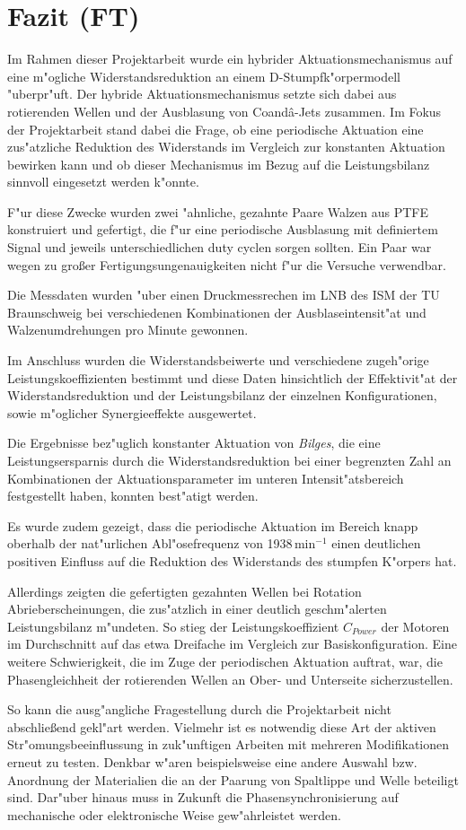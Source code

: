 \chapter{Fazit (FT)}\label{s:fazit}
Im Rahmen dieser Projektarbeit wurde ein hybrider Aktuationsmechanismus auf eine m"ogliche Widerstandsreduktion an einem D-Stumpfk"orpermodell "uberpr"uft.
Der hybride Aktuationsmechanismus setzte sich dabei aus rotierenden Wellen und der Ausblasung von Coand\^{a}-Jets zusammen.
Im Fokus der Projektarbeit stand dabei die Frage, ob eine periodische Aktuation eine zus"atzliche Reduktion des Widerstands im Vergleich zur konstanten Aktuation bewirken kann und ob dieser Mechanismus im Bezug auf die Leistungsbilanz sinnvoll eingesetzt werden k"onnte.

F"ur diese Zwecke wurden zwei "ahnliche, gezahnte Paare Walzen aus PTFE konstruiert und gefertigt, die f"ur eine periodische Ausblasung mit definiertem Signal und jeweils unterschiedlichen duty cyclen sorgen sollten. Ein Paar war wegen zu gro\ss{}er Fertigungsungenauigkeiten nicht f"ur die Versuche verwendbar.

Die Messdaten wurden "uber einen Druckmessrechen im LNB des ISM der TU Braunschweig bei verschiedenen Kombinationen der Ausblaseintensit"at und Walzenumdrehungen pro Minute gewonnen.

Im Anschluss wurden die Widerstandsbeiwerte  und verschiedene zugeh"orige Leistungskoeffizienten bestimmt und diese Daten hinsichtlich der Effektivit"at der Widerstandsreduktion und der Leistungsbilanz der einzelnen Konfigurationen, sowie m"oglicher Synergieeffekte ausgewertet.

Die Ergebnisse bez"uglich konstanter Aktuation von \textit{Bilges}, die eine Leistungsersparnis durch die Widerstandsreduktion bei einer begrenzten Zahl an Kombinationen der Aktuationsparameter im unteren Intensit"atsbereich festgestellt haben, konnten best"atigt werden. 

Es wurde zudem gezeigt, dass die periodische Aktuation im Bereich knapp oberhalb der nat"urlichen Abl"osefrequenz von 1938\,$\mathrm{min^{-1}}$ einen deutlichen positiven Einfluss auf die Reduktion des Widerstands des stumpfen K"orpers hat.

Allerdings zeigten die gefertigten gezahnten Wellen bei Rotation Abrieberscheinungen, die zus"atzlich in einer deutlich geschm"alerten  Leistungsbilanz m"undeten.
So stieg der Leistungskoeffizient $C_{Power}$ der Motoren  im Durchschnitt auf das etwa Dreifache im Vergleich zur Basiskonfiguration.
Eine weitere Schwierigkeit, die im Zuge der periodischen Aktuation auftrat, war, die Phasengleichheit der rotierenden Wellen an Ober- und Unterseite sicherzustellen.

So kann die ausg"angliche Fragestellung durch die Projektarbeit nicht abschlie\ss{}end gekl"art werden. Vielmehr ist es notwendig diese Art der aktiven Str"omungsbeeinflussung in zuk"unftigen Arbeiten mit mehreren Modifikationen erneut zu testen. Denkbar w"aren beispielsweise eine andere Auswahl bzw. Anordnung der  Materialien die an der Paarung von Spaltlippe und Welle beteiligt sind. Dar"uber hinaus muss in Zukunft die Phasensynchronisierung auf mechanische oder elektronische Weise gew"ahrleistet werden.